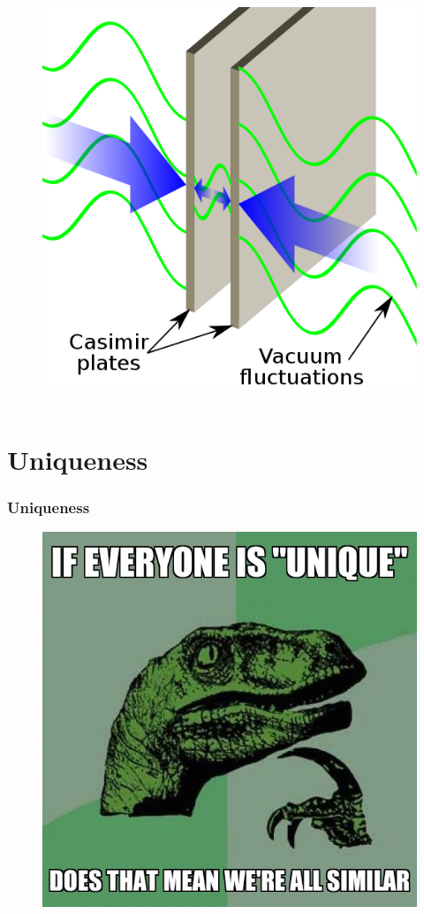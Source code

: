 \documentclass{beamer}
\begin{document}
\begin{frame}
\begin{columns}[c]
\begin{column}{0.3\textwidth}
\begin{figure}
\includegraphics[width=\linewidth]{casimir.png}
\end{figure}

\end{column}
\end{columns}

\end{frame}


\section{Uniqueness}

\begin{frame}
\frametitle{Uniqueness} 
\begin{figure}
\includegraphics[width=0.55\linewidth]{unique.jpeg}
\end{figure}
\end{frame}
\end{document}
